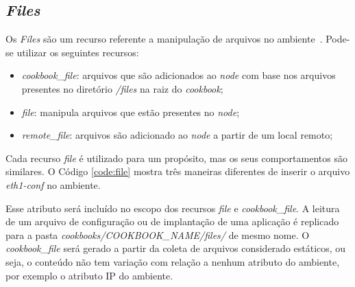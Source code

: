 \subsection{\textit{Files}}
\label{sec:cbfiles}

Os \textit{Files} são um recurso referente a manipulação de arquivos no ambiente~\cite{chefdoc:2016}.
Pode-se utilizar os seguintes recursos:

\begin{itemize}
  \item \textit{cookbook\_file}: arquivos que são adicionados ao \textit{node} com base
    nos arquivos presentes no diretório \textit{/files} na raiz do \textit{cookbook};
  \item \textit{file}: manipula arquivos que estão presentes no \textit{node};
  \item \textit{remote\_file}: arquivos são adicionado ao \textit{node} a partir de um
    local remoto;
\end{itemize}

Cada recurso \textit{file} é utilizado para um propósito, mas os seus comportamentos
são similares. O Código \ref{code:file} mostra três maneiras diferentes de
inserir o arquivo \textit{eth1-conf} no ambiente.

\begin{minipage}{.90\textwidth}
  \lstset{style=shell}
  
\end{minipage}

Esse atributo será incluído no escopo dos recursos \textit{file} e \textit{cookbook\_file}.
A leitura de um arquivo de configuração ou de implantação de uma aplicação 
é replicado para a pasta \textit{cookbooks/COOKBOOK\_NAME/files/} de mesmo nome.
O \textit{cookbook\_file} será gerado a partir da coleta de arquivos considerado estáticos,
ou seja, o conteúdo não tem variação com relação a nenhum atributo do ambiente,
por exemplo o atributo IP do ambiente.
